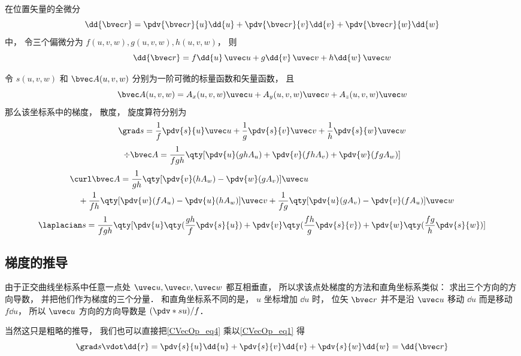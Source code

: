 

在位置矢量的全微分
\begin{equation}
\dd{\bvec r} = \pdv{\bvec r}{u}\dd{u} + \pdv{\bvec r}{v}\dd{v} + \pdv{\bvec r}{w}\dd{w}
\end{equation}
中， 令三个偏微分为 $f(u,v,w), g(u,v,w), h(u,v,w)$， 则
\begin{equation}\label{CVecOp_eq4}
\dd{\bvec r} = f\dd{u}\,\uvec u + g\dd{v}\,\uvec v + h\dd{w}\,\uvec w
\end{equation}

令 $s(u, v, w)$ 和 $\bvec A(u, v, w)$ 分别为一阶可微的标量函数和矢量函数， 且
\begin{equation}
\bvec A(u, v, w) = A_x(u, v, w)\uvec u + A_y(u, v, w)\uvec v + A_z(u, v, w)\uvec w
\end{equation}
那么该坐标系中的梯度， 散度， 旋度算符分别为
\begin{equation}\label{CVecOp_eq1}
\grad s = \frac{1}{f} \pdv{s}{u}\uvec u + \frac{1}{g}\pdv{s}{v} \uvec v + \frac{1}{h} \pdv{s}{w}\uvec w
\end{equation}
\begin{equation}
\div \bvec A = \frac{1}{fgh}\qty[\pdv{u}(ghA_u) + \pdv{v}(fhA_v) + \pdv{w}(fgA_w)]
\end{equation}
\begin{equation}
\begin{aligned}
&\curl \bvec A = \frac{1}{gh}\qty[\pdv{v}(hA_w) - \pdv{w}(gA_v)]\uvec u\\
&\quad + \frac{1}{fh}\qty[\pdv{w}(fA_u) - \pdv{u}(hA_w)]\uvec v
+ \frac{1}{fg}\qty[\pdv{u}(gA_v) - \pdv{v}(fA_u)]\uvec w
\end{aligned}
\end{equation}
\begin{equation}\label{CVecOp_eq6}
\laplacian s = \frac{1}{fgh}\qty[\pdv{u}\qty(\frac{gh}{f}\pdv{s}{u}) + \pdv{v}\qty(\frac{fh}{g}\pdv{s}{v}) + \pdv{w}\qty(\frac{fg}{h}\pdv{s}{w})]
\end{equation}

\subsection{梯度的推导}
由于正交曲线坐标系中任意一点处 $\uvec u, \uvec v, \uvec w$ 都互相垂直， 所以求该点处梯度的方法和直角坐标系类似： 求出三个方向的方向导数， 并把他们作为梯度的三个分量． 和直角坐标系不同的是， $u$ 坐标增加 $\dd{u}$ 时， 位矢 $\bvec r$ 并不是沿 $\uvec u$ 移动 $\dd{u}$ 而是移动 $f \dd{u}$， 所以 $\uvec u$ 方向的方向导数是 $(\pdv*{s}{u})/f$．

当然这只是粗略的推导， 我们也可以直接把\autoref{CVecOp_eq4} 乘以\autoref{CVecOp_eq1} 得
\begin{equation}
\grad s \vdot \dd{r} = \pdv{s}{u}\dd{u} + \pdv{s}{v}\dd{v} + \pdv{s}{w}\dd{w} = \dd{\bvec r}
\end{equation}



